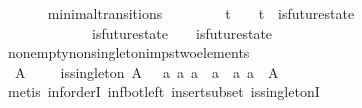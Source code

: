 \begin{isabellebody}
\ \ \isanewline
\ \ \ \ {\isachardoublequoteopen}minimal{\isacharunderscore}transitions\ {\isasymequiv}\ {\isacharbraceleft}{\isacharparenleft}{\isasymsigma}{\isacharcomma}\ {\isasymsigma}{\isacharprime}{\isacharparenright}\ {\isacharbar}\ {\isasymsigma}\ {\isasymsigma}{\isacharprime}{\isachardot}\ {\isasymsigma}\ {\isasymin}\ {\isasymSigma}t\ {\isasymand}\ {\isasymsigma}{\isacharprime}\ {\isasymin}\ {\isasymSigma}t\ {\isasymand}\ is{\isacharunderscore}future{\isacharunderscore}state\ {\isacharparenleft}{\isasymsigma}{\isacharcomma}\ {\isasymsigma}{\isacharprime}{\isacharparenright}\ {\isasymand}\ {\isasymsigma}\ {\isasymnoteq}\ {\isasymsigma}{\isacharprime}\isanewline
\ \ \ \ \ \ {\isasymand}\ {\isacharparenleft}{\isasymnexists}\ {\isasymsigma}{\isacharprime}{\isacharprime}{\isachardot}\ {\isasymsigma}{\isacharprime}{\isacharprime}\ {\isasymin}\ {\isasymSigma}\ {\isasymand}\ is{\isacharunderscore}future{\isacharunderscore}state\ {\isacharparenleft}{\isasymsigma}{\isacharcomma}\ {\isasymsigma}{\isacharprime}{\isacharprime}{\isacharparenright}\ {\isasymand}\ is{\isacharunderscore}future{\isacharunderscore}state\ {\isacharparenleft}{\isasymsigma}{\isacharprime}{\isacharprime}{\isacharcomma}\ {\isasymsigma}{\isacharprime}{\isacharparenright}\ {\isasymand}\ {\isasymsigma}\ {\isasymnoteq}\ {\isasymsigma}{\isacharprime}{\isacharprime}\ {\isasymand}\ {\isasymsigma}{\isacharprime}{\isacharprime}\ {\isasymnoteq}\ {\isasymsigma}{\isacharprime}{\isacharparenright}{\isacharbraceright}{\isachardoublequoteclose}\isanewline
\isanewline
{}\isamarkupfalse%
\ non{\isacharunderscore}empty{\isacharunderscore}non{\isacharunderscore}singleton{\isacharunderscore}imps{\isacharunderscore}two{\isacharunderscore}elements\ {\isacharcolon}\ \isanewline
\ \ {\isachardoublequoteopen}A\ {\isasymnoteq}\ {\isasymemptyset}\ {\isasymLongrightarrow}\ {\isasymnot}\ is{\isacharunderscore}singleton\ A\ {\isasymLongrightarrow}\ {\isasymexists}\ a{}\ a{}{\isachardot}\ a{}\ {\isasymnoteq}\ a{}\ {\isasymand}\ {\isacharbraceleft}a{}{\isacharcomma}\ a{}{\isacharbraceright}\ {\isasymsubseteq}\ A{\isachardoublequoteclose}\isanewline
%
\isadelimproof
\ \ %
\endisadelimproof
%
\isatagproof
{}\isamarkupfalse%
\ {\isacharparenleft}metis\ inf{\isachardot}orderI\ inf{\isacharunderscore}bot{\isacharunderscore}left\ insert{\isacharunderscore}subset\ is{\isacharunderscore}singletonI{\isacharprime}{\isacharparenright}%
\endisatagproof
{\isafoldproof}%
%
\isadelimproof
\isanewline
%
\endisadelimproof

\end{isabellebody}
